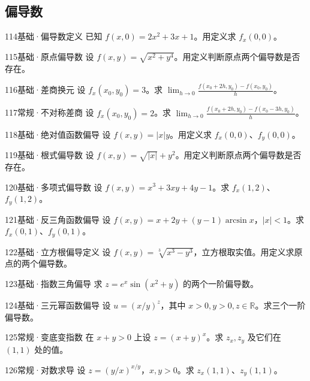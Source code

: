 \subsection{偏导数}
\begin{exercise}{114}{基础·偏导数定义}
已知 $f(x,0)=2x^2+3x+1$。用定义求 $f_x(0,0)$。
\end{exercise}
\begin{exercise}{115}{基础·原点偏导数}
设 $f(x,y)=\sqrt{x^2+y^4}$。用定义判断原点两个偏导数是否存在。
\end{exercise}
\begin{exercise}{116}{基础·差商换元}
设 $f_x(x_0,y_0)=3$。求 $\lim_{h\to0}\frac{f(x_0+2h,y_0)-f(x_0,y_0)}h$。
\end{exercise}
\begin{exercise}{117}{常规·不对称差商}
设 $f_x(x_0,y_0)=2$。求 $\lim_{h\to0}\frac{f(x_0+2h,y_0)-f(x_0-3h,y_0)}h$。
\end{exercise}
\begin{exercise}{118}{基础·绝对值函数偏导}
设 $f(x,y)=|x|y$。用定义求 $f_x(0,0)$、$f_y(0,0)$。
\end{exercise}
\begin{exercise}{119}{基础·根式偏导数}
设 $f(x,y)=\sqrt{|x|}+y^2$。用定义判断原点两个偏导数是否存在。
\end{exercise}
\begin{exercise}{120}{基础·多项式偏导数}
设 $f(x,y)=x^3+3xy+4y-1$。求 $f_x(1,2)$、$f_y(1,2)$。
\end{exercise}
\begin{exercise}{121}{基础·反三角函数偏导}
设 $f(x,y)=x+2y+(y-1)\arcsin x$，$|x|<1$。求 $f_x(0,1)$、$f_y(0,1)$。
\end{exercise}
\begin{exercise}{122}{基础·立方根偏导定义}
设 $f(x,y)=\sqrt[3]{x^3-y^3}$，立方根取实值。用定义求原点的两个偏导数。
\end{exercise}
\begin{exercise}{123}{基础·指数三角偏导}
求 $z=e^x\sin(x^2+y)$ 的两个一阶偏导数。
\end{exercise}
\begin{exercise}{124}{基础·三元幂函数偏导}
设 $u=(x/y)^z$，其中 $x>0,y>0,z\in\mathbb R$。求三个一阶偏导数。
\end{exercise}
\begin{exercise}{125}{常规·变底变指数}
在 $x+y>0$ 上设 $z=(x+y)^x$。求 $z_x,z_y$ 及它们在 $(1,1)$ 处的值。
\end{exercise}
\begin{exercise}{126}{常规·对数求导}
设 $z=(y/x)^{x/y}$，$x,y>0$。求 $z_x(1,1)$、$z_y(1,1)$。
\end{exercise}
